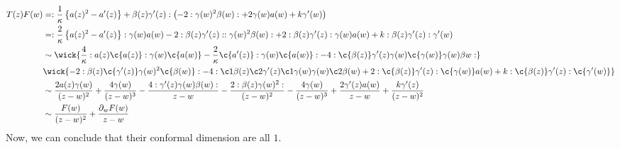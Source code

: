 \begin{equation}
	\begin{split}
	T(z)F(w) &= : \frac{1}{\kappa} \left\{ a(z)^2 - a'(z) \right\} + \beta(z)\gamma'(z): \left(-2 : \gamma(w)^2 \beta(w): + 2 \gamma(w)a(w) + k \gamma'(w) \right)\\
	& = : \frac{2}{\kappa} \left\{a(z)^2 - a'(z) \right\}: \gamma(w) a(w) - 2 : \beta(z)\gamma'(z): : \gamma(w)^2\beta(w): + 2 : \beta(z) \gamma'(z): \gamma(w) a(w) + k :\beta(z) \gamma'(z): \gamma'(w)\\
	& \sim \wick{ \frac{4}{\kappa} : a(z) \c{a(z)}:\gamma(w) \c{a(w)} - \frac{2}{\kappa} \c{a'(z)}: \gamma(w) \c{a(w)}: - 4 :\c{\beta(z)} \gamma'(z) \gamma(w) \c{\gamma(w)} \gamma(w) \beta{w}:  }\\
	& \wick{-2: \beta(z) \c{\gamma'(z)} \gamma(w)^2 \c{\beta(w)}: - 4 : \c1{\beta(z)} \c2{\gamma'(z)} \c1{\gamma(w)} \gamma(w) \c2{\beta(w)} + 2 : \c{\beta(z)} \gamma'(z): \c{\gamma(w)} a(w) + k : \c{\beta(z)} \gamma'(z): \c{\gamma'(w)} }\\
	& \sim \frac{2a(z)\gamma(w)}{(z-w)^2} + \frac{4 \gamma(w)}{(z-w)^3} - \frac{4: \gamma'(z)\gamma(w) \beta(w):}{z-w} - \frac{2: \beta(z) \gamma(w)^2:}{(z-w)^2} - \frac{4 \gamma(w)}{(z-w)^3} + \frac{2\gamma'(z)a(w)}{z-w} + \frac{k\gamma'(z)}{(z-w)^2}\\
	& \sim \frac{F(w)}{(z-w)^2} + \frac{\partial_w F(w)}{z-w}
	\end{split}
\end{equation}
Now, we can conclude that their conformal dimension are all $1$.